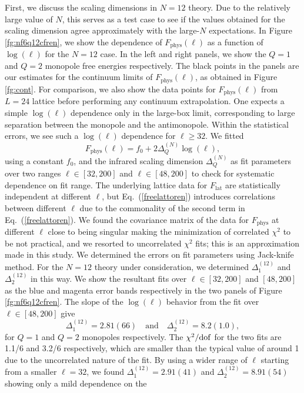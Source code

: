 \documentclass[prd, onecolumn, superscriptaddress, nofootinbib, notitlepage, floatfix]{revtex4-1}
\newcommand\beq{\begin{equation}}
\newcommand\eeq[1]{\label{#1}\end{equation}}
\newcommand\fgn[1]{Figure \ref{fg:#1}}
\newcommand\eqn[1]{Eq.\ (\ref{#1})}
\newcommand{\lat}{\mathrm{lat}}
\newcommand{\phys}{\mathrm{phys}}
\begin{document}
First, we discuss the scaling dimensions in $N=12$ theory.  Due to
the relatively large value of $N$, this serves as a test case to
see if the values obtained for the scaling dimension agree approximately
with the large-$N$ expectations.  In \fgn{nf6q12cfren}, we show the
dependence of $F_\phys(\ell)$ as a function of $\log(\ell)$ for the
$N=12$ case.  In the left and right panels, we show the $Q=1$ and
$Q=2$ monopole free energies respectively.  The black points in the
panels are our estimates for the continuum limits of $F_\phys(\ell)$,
as obtained in \fgn{cont}. For comparison, we also show the data
points for $F_\phys(\ell)$ from $L=24$ lattice before performing
any continuum extrapolation.  One expects a simple $\log(\ell)$
dependence only in the large-box limit, corresponding to large
separation between the monopole and the antimonopole. Within the
statistical errors, we see such a $\log(\ell)$ dependence for
$\ell\ge 32$. We fitted
\beq
F_\phys(\ell) = f_0 + 2\Delta_Q^{(N)}\log(\ell),
\eeq{asymfitform}
using a constant $f_0$, and the infrared scaling dimension
$\Delta_Q^{(N)}$ as fit parameters over two ranges $\ell\in[32,200]$
and $\ell\in[48,200]$ to check for systematic dependence on fit
range.  The underlying lattice data for $F_\lat$ are statistically
independent at different $\ell$, but \eqn{freelattoren} introduces
correlations between different $\ell$ due to the commonality of the
second term in \eqn{freelattoren}. We found the covariance matrix
of the data for $F_\phys$ at different $\ell$ close to being singular
making the minimization of correlated $\chi^2$ to be not practical,
and we resorted to uncorrelated $\chi^2$ fits; this is an approximation
made in this study. We determined the errors on fit parameters using
Jack-knife method.  For the $N=12$ theory under consideration, we
determined $\Delta_1^{(12)}$ and $\Delta_2^{(12)}$ in this way. We
show the resultant fits over $\ell\in[32,200]$ and $[48,200]$ as
the blue and magenta error bands respectively in the two panels of
\fgn{nf6q12cfren}.  The slope of the $\log(\ell)$ behavior from the
fit over $\ell\in[48,200]$ give
\beq
\Delta_1^{(12)}=2.81(66)\quad\text{and}\quad \Delta_2^{(12)}=8.2(1.0),
\eeq{n12q12deltavals}
for $Q=1$ and $Q=2$ monopoles respectively. The $\chi^2/{\rm dof}$
for the two fits are 1.1/6 and 3.2/6 respectively, which are smaller
than the typical value of around 1 due to the uncorrelated nature
of the fit.  By using a wider range of $\ell$ starting from a smaller
$\ell=32$, we found $\Delta_1^{(12)}=2.91(41)$ and
$\Delta_2^{(12)}=8.91(54)$ showing only a mild dependence on the
\end{document}
